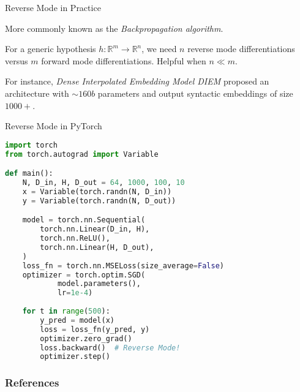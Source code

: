 \documentclass{beamer}
\begin{document}
\begin{frame}{Reverse Mode in Practice}

More commonly known as the \textit{Backpropagation algorithm}.

For a generic hypothesis $h: \mathbb{R}^m \to \mathbb{R}^n$, we need $n$
reverse mode differentiations versus $m$ forward mode differentiations. 
Helpful when $n \ll m$.

For instance, \textit{Dense Interpolated Embedding Model DIEM} \cite{Trask2015}
proposed an architecture with $\sim 160b$ parameters and output syntactic embeddings
of size $1000+$.

\end{frame}

\begin{frame}{Reverse Mode in PyTorch}

\begin{lstlisting}[language=Python]
import torch
from torch.autograd import Variable

def main():
    N, D_in, H, D_out = 64, 1000, 100, 10
    x = Variable(torch.randn(N, D_in))
    y = Variable(torch.randn(N, D_out))

    model = torch.nn.Sequential(
        torch.nn.Linear(D_in, H),
        torch.nn.ReLU(),
        torch.nn.Linear(H, D_out),
    )    
    loss_fn = torch.nn.MSELoss(size_average=False)
    optimizer = torch.optim.SGD(
    		model.parameters(),
    		lr=1e-4)
    
    for t in range(500):
        y_pred = model(x)
        loss = loss_fn(y_pred, y)
        optimizer.zero_grad()
        loss.backward()  # Reverse Mode!
        optimizer.step()
\end{lstlisting}

\end{frame}

\begin{frame}[allowframebreaks]

\nocite{DBLP:journals/corr/BaydinPR15}
\nocite{Griewank2008}

\frametitle{References}


\end{frame}
\end{document}

